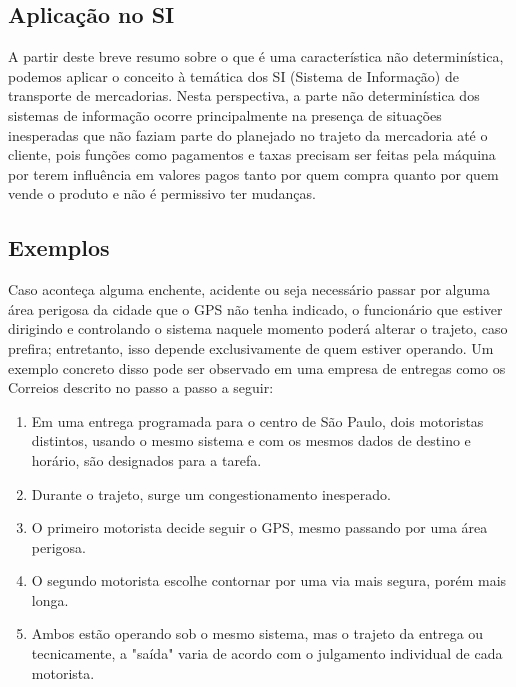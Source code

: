 \documentclass[conference]{IEEEtran}
\begin{document}
\subsection{Aplicação no SI}
A partir deste breve resumo sobre o que é uma característica não determinística, podemos aplicar o conceito à temática dos SI (Sistema de Informação) de transporte de mercadorias. Nesta perspectiva, a parte não determinística dos sistemas de informação ocorre principalmente na presença de situações inesperadas que não faziam parte do planejado no trajeto da mercadoria até o cliente, pois funções como pagamentos e taxas precisam ser feitas pela máquina por terem influência em valores pagos tanto por quem compra quanto por quem vende o produto e não é permissivo ter mudanças.
\subsection{Exemplos}
Caso aconteça alguma enchente, acidente ou seja necessário passar por alguma área perigosa da cidade que o GPS não tenha indicado, o funcionário que estiver dirigindo e controlando o sistema naquele momento poderá alterar o trajeto, caso prefira; entretanto, isso depende exclusivamente de quem estiver operando. Um exemplo concreto disso pode ser observado em uma empresa de entregas como os Correios descrito no passo a passo a seguir:

\begin{enumerate}
    \item Em uma entrega programada para o centro de São Paulo, dois motoristas distintos, usando o mesmo sistema e com os mesmos dados de destino e horário, são designados para a tarefa.   
    \item Durante o trajeto, surge um congestionamento inesperado.
    \item O primeiro motorista decide seguir o GPS, mesmo passando por uma área perigosa.
    \item O segundo motorista escolhe contornar por uma via mais segura, porém mais longa.
    \item Ambos estão operando sob o mesmo sistema, mas o trajeto da entrega ou tecnicamente, a "saída" varia de acordo com o julgamento individual de cada motorista.
\end{enumerate}
\end{document}
